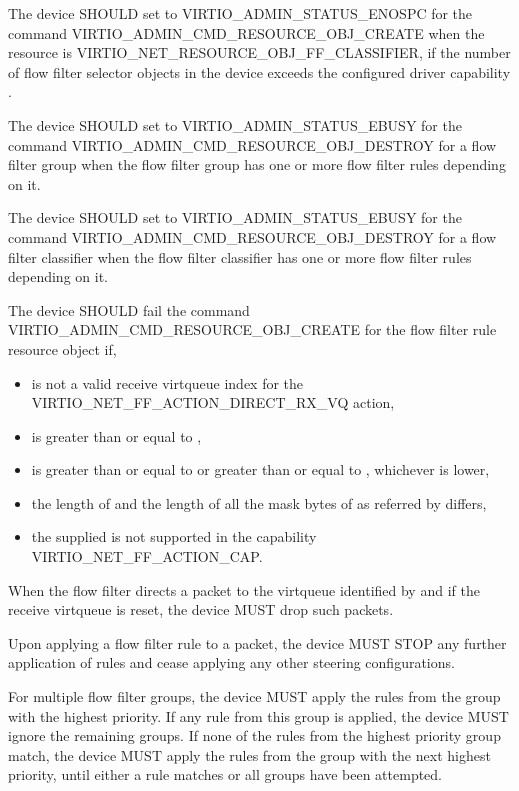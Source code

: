 The device SHOULD set  to VIRTIO_ADMIN_STATUS_ENOSPC for the
command VIRTIO_ADMIN_CMD_RESOURCE_OBJ_CREATE when the resource  is
VIRTIO_NET_RESOURCE_OBJ_FF_CLASSIFIER, if the number of flow filter selector
objects in the device exceeds the configured driver capability
.

The device SHOULD set  to VIRTIO_ADMIN_STATUS_EBUSY for the
command VIRTIO_ADMIN_CMD_RESOURCE_OBJ_DESTROY for a flow filter group when
the flow filter group has one or more flow filter rules depending on it.

The device SHOULD set  to VIRTIO_ADMIN_STATUS_EBUSY for the
command VIRTIO_ADMIN_CMD_RESOURCE_OBJ_DESTROY for a flow filter classifier when
the flow filter classifier has one or more flow filter rules depending on it.

The device SHOULD fail the command VIRTIO_ADMIN_CMD_RESOURCE_OBJ_CREATE for the
flow filter rule resource object if,
\begin{itemize}
\item {} is not a valid receive virtqueue index for
the VIRTIO_NET_FF_ACTION_DIRECT_RX_VQ action,
\item {} is greater than or equal to
      ,
\item {} is greater than or equal to  or
      greater than or equal to , whichever is lower,
\item the length of  and the length of all the mask bytes of
       as referred by  differs,
\item the supplied  is not supported in the capability VIRTIO_NET_FF_ACTION_CAP.
\end{itemize}

When the flow filter directs a packet to the virtqueue identified by
 and if the receive virtqueue is reset, the device
MUST drop such packets.

Upon applying a flow filter rule to a packet, the device MUST STOP any further
application of rules and cease applying any other steering configurations.

For multiple flow filter groups, the device MUST apply the rules from
the group with the highest priority. If any rule from this group is applied,
the device MUST ignore the remaining groups. If none of the rules from the
highest priority group match, the device MUST apply the rules from
the group with the next highest priority, until either a rule matches or
all groups have been attempted.

